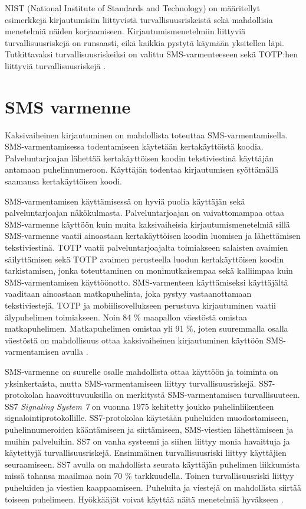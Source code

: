 NIST (National Institute of Standards and Technology) on määritellyt esimerkkejä kirjautumisiin liittyvistä turvallisuusriskeistä sekä mahdollisia menetelmiä näiden korjaamiseen. Kirjautumismenetelmiin liittyviä turvallisuusriskejä on runsaasti, eikä kaikkia pystytä käymään yksitellen läpi. Tutkittavaksi turvallisuusriskeiksi on valittu SMS-varmenteeseen sekä TOTP:hen liittyviä turvallisuusriskejä \citep{NIST_800_63B}.

\section{SMS varmenne}
Kaksivaiheinen kirjautuminen on mahdollista toteuttaa SMS-varmentamisella. SMS-varmentamisessa todentamiseen käytetään kertakäyttöistä koodia. Palveluntarjoajan lähettää kertakäyttöisen koodin tekstiviestinä käyttäjän antamaan puhelinnumeroon. Käyttäjän todentaa kirjautumisen syöttämällä saamansa kertakäyttöisen koodi. 

SMS-varmentamisen käyttämisessä on hyviä puolia käyttäjän sekä palveluntarjoajan näkökulmasta. Palveluntarjoajan on vaivattomampaa ottaa SMS-varmenne käyttöön kuin muita kaksivaiheisia kirjautumismenetelmiä sillä SMS-varmenne vaatii ainoastaan kertakäyttöisen koodin luomisen ja lähettämisen tekstiviestinä. TOTP vaatii palveluntarjoajalta toimiakseen salaisten avaimien säilyttämisen sekä TOTP avaimen perusteella luodun kertakäyttöisen koodin tarkistamisen, jonka toteuttaminen on monimutkaisempaa sekä kalliimpaa kuin SMS-varmentamisen käyttöönotto. SMS-varmenteen käyttämiseksi käyttäjältä vaaditaan ainoastaan matkapuhelinta, joka pystyy vastaanottamaan tekstiviestejä. TOTP ja mobiilisovellukseen perustuva kirjautuminen vaatii älypuhelimen toimiakseen. Noin 84 \% maapallon väestöstä omistaa matkapuhelimen. Matkapuhelimen omistaa yli 91 \%, joten suuremmalla osalla väestöstä on mahdollisuus ottaa kaksivaiheinen kirjautuminen käyttöön SMS-varmentamisen avulla \citep{smartphones_in_the_world} \citep{10.1145/3488932.3497756}.

SMS-varmenne on suurelle osalle mahdollista ottaa käyttöön ja toiminta on yksinkertaista, mutta SMS-varmentamiseen liittyy turvallisuusriskejä. SS7-protokolan haavoittuvuuksilla on merkitystä SMS-varmentamisen turvallisuuteen. SS7 \emph{Signaling System 7} on vuonna 1975 kehitetty joukko puhelinliikenteen signalointiprotokollille. SS7-protokolaa käytetään puheluiden muodostamiseen, puhelinnumeroiden kääntämiseen ja siirtämiseen, SMS-viestien lähettämiseen ja muihin palveluihin. SS7 on vanha systeemi ja siihen liittyy monia havaittuja ja käytettyjä turvallisuusriskejä. Ensimmäinen turvallisuusriski liittyy käyttäjien seuraamiseen. SS7 avulla on mahdollista seurata käyttäjän puhelimen liikkumista missä tahansa maailmaa noin 70 \% tarkkuudella. Toinen turvallisuusriski liittyy puheluiden ja viestien kaappaamiseen. Puheluita ja viestejä on mahdollista siirtää toiseen puhelimeen. Hyökkääjät voivat käyttää näitä menetelmiä hyväkseen \citep{ss7} \citep{SMS_2FA_HYPR}.

